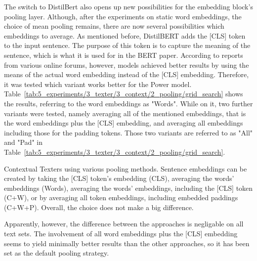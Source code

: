 The switch to DistilBert also opens up new possibilities for the embedding block's pooling layer. Although, after the experiments on static word embeddings, the choice of mean pooling remains, there are now several possibilities which embeddings to average. As mentioned before, DistilBERT adds the [CLS] token to the input sentence. The purpose of this token is to capture the meaning of the sentence, which is what it is used for in the BERT paper. According to reports from various online forums, however, models achieved better results by using the means of the actual word embedding instead of the [CLS] embedding. Therefore, it was tested which variant works better for the Power model. Table~\ref{tab:5_experiments/3_texter/3_context/2_pooling/grid_search} shows the results, referring to the word embeddings as "Words". While on it, two further variants were tested, namely averaging all of the mentioned embeddings, that is the word embeddings plus the [CLS] embedding, and averaging all embeddings including those for the padding tokens. Those two variants are referred to as "All" and "Pad" in Table~\ref{tab:5_experiments/3_texter/3_context/2_pooling/grid_search}.

\begin{table}[h]
    \centering
    
    \caption{Contextual Texters using various pooling methods. Sentence embeddings can be created by taking the [CLS] token's embedding (CLS), averaging the words' embeddings (Words), averaging the words' embeddings, including the [CLS] token (C+W), or by averaging all token embeddings, including embedded paddings (C+W+P). Overall, the choice does not make a big difference.}
    \label{tab:5_experiments/3_texter/3_context/2_pooling/grid_search}
\end{table}

Apparently, however, the difference between the approaches is negligable on all text sets. The involvement of all word embeddings plus the [CLS] embedding seems to yield minimally better results than the other approaches, so it has been set as the default pooling strategy.
